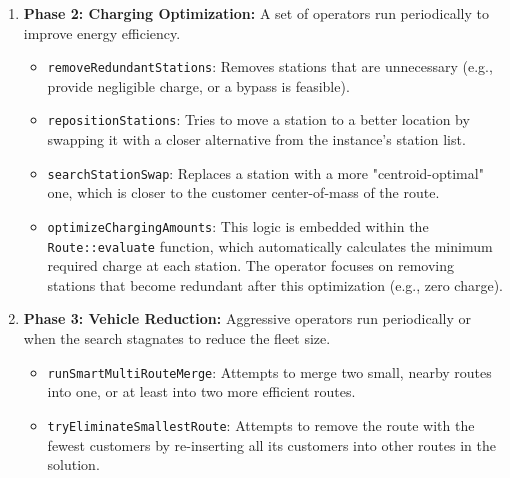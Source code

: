 \documentclass[a4paper,12pt]{article}
\begin{document}
\begin{enumerate}
\begin{itemize}
        \item \textbf{2-Opt (Intra-route):} Reverses a segment within a single route to untangle paths. A quick distance-saving check is performed before the full evaluation.
        \item \textbf{Inter-2-Opt (Cross-route):} Exchanges the tails of two different routes. This powerful operator can significantly restructure the solution. It is filtered by route granularity.
        \item \textbf{Or-Opt:} Moves a contiguous segment of 2-3 customers to another position.
    \end{itemize}
    \item \textbf{Phase 2: Charging Optimization:} A set of operators run periodically to improve energy efficiency.
    \begin{itemize}
        \item \texttt{removeRedundantStations}: Removes stations that are unnecessary (e.g., provide negligible charge, or a bypass is feasible).
        \item \texttt{repositionStations}: Tries to move a station to a better location by swapping it with a closer alternative from the instance's station list.
        \item \texttt{searchStationSwap}: Replaces a station with a more "centroid-optimal" one, which is closer to the customer center-of-mass of the route.
        \item \texttt{optimizeChargingAmounts}: This logic is embedded within the \texttt{Route::evaluate} function, which automatically calculates the minimum required charge at each station. The operator focuses on removing stations that become redundant after this optimization (e.g., zero charge).
    \end{itemize}
    \item \textbf{Phase 3: Vehicle Reduction:} Aggressive operators run periodically or when the search stagnates to reduce the fleet size.
    \begin{itemize}
        \item \texttt{runSmartMultiRouteMerge}: Attempts to merge two small, nearby routes into one, or at least into two more efficient routes.
        \item \texttt{tryEliminateSmallestRoute}: Attempts to remove the route with the fewest customers by re-inserting all its customers into other routes in the solution.
    \end{itemize}
\end{enumerate}
\end{document}
